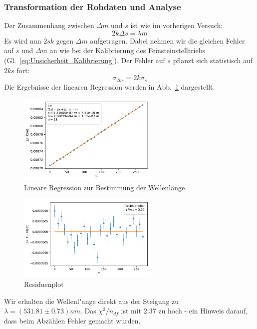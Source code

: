 \documentclass[12pt,a4paper]{article}
\begin{document}
\subsubsection{Transformation der Rohdaten und Analyse}
Der Zusammenhang zwischen $\Delta m$ und $s$ ist wie im vorherigen Versuch:
\begin{equation}
2k\Delta s=\lambda m
\end{equation}
Es wird nun $2sk$ gegen $\Delta m$ aufgetragen. Dabei nehmen wir die gleichen Fehler auf $s$ und $\Delta m$ an wie bei der Kalibrierung des Feinsteinstelltriebs (Gl.~\eqref{eq:Unsicherheit_Kalibrierung}). Der Fehler auf $s$ pflanzt sich statistisch auf $2ks$ fort:
\begin{equation}
\sigma_{2ks}=2k\sigma_s
\end{equation}
Die Ergebnisse der linearen Regression werden in Abb.~\ref{Wellenlaenge_LinReg} dargestellt.
\begin{figure}[H]
	\centering
	\includegraphics[width=0.6\textwidth]{Python/Lambdagruen_LinReg.pdf}
	\caption{Lineare Regression zur Bestimmung der Wellenlänge}
	\label{Wellenlaenge_LinReg}
\end{figure}
\begin{figure}[H]
	\centering
	\includegraphics[width=0.6\textwidth]{Python/Lambdagruen_Residuen.pdf}
	\caption{Residuenplot}
\end{figure}
Wir erhalten die Wellenl"ange direkt aus der Steigung zu $\lambda=(531.81\pm0.73)nm$. Das $\chi^2/n_{df}$ ist mit 2.37 zu hoch - ein Hinweis darauf, dass beim Abzählen Fehler gemacht wurden. 
\end{document}
